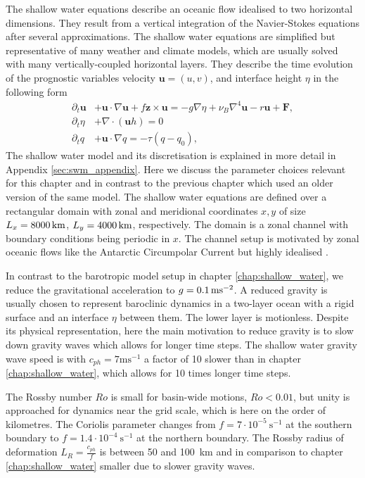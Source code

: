 The shallow water equations describe an oceanic flow idealised to two horizontal dimensions. They result from
a vertical integration of the Navier-Stokes equations \citep{Gill1982,Vallis2006} after several approximations.
The shallow water equations are simplified but representative of many weather and climate models, which are
usually solved with many vertically-coupled horizontal layers. They describe the time
evolution of the prognostic variables velocity $\mathbf{u} = (u,v)$, and interface height $\eta$  in the following form 
\begin{align}
\partial_t\mathbf{u} &+ \mathbf{u} \cdot \nabla \mathbf{u} + f\mathbf{z} \times \mathbf{u} =
-g\nabla \eta + \nu_B \nabla^4 \mathbf{u} - r \mathbf{u} + \mathbf{F}, \nonumber \\
\partial_t\eta &+ \nabla \cdot (\mathbf{u}h) = 0 \nonumber \\ 
\partial_tq &+ \mathbf{u} \cdot \nabla q = -\tau(q-q_0),
\label{eq:swm_a64fx}
\end{align}
The shallow water model and its discretisation is explained in more detail in Appendix \ref{sec:swm_appendix}. Here we
discuss the parameter choices relevant for this chapter and in contrast to the previous chapter which used an older version
of the same model. The shallow water equations are defined over a rectangular domain
with zonal and meridional coordinates $x,y$ of size $L_x = 8000\operatorname{km}$, $L_y  = 4000\operatorname{km}$, respectively. The domain
is a zonal channel with boundary conditions being periodic in $x$. The channel setup is motivated by zonal oceanic flows like
the Antarctic Circumpolar Current but highly idealised \citep{Jansen2015,Jansen2015a}.

In contrast to the barotropic model setup in chapter \ref{chap:shallow_water}, we reduce the gravitational acceleration to
$g = 0.1\operatorname{ms}^{-2}$. A reduced gravity is usually chosen to represent baroclinic dynamics in a two-layer ocean
with a rigid surface and an interface $\eta$ between them. The lower layer is motionless. Despite its physical representation,
here the main motivation to reduce gravity is to slow down gravity waves which allows for longer time steps.
The shallow water gravity wave speed is with $c_{ph} = 7 \mathrm{ms}^{-1}$ a factor of 10 slower than in
chapter \ref{chap:shallow_water}, which allows for 10 times longer time steps.

The Rossby number $Ro$ is small for basin-wide motions, $Ro < 0.01$, but unity is approached for dynamics near the grid scale,
which is here on the order of kilometres. The Coriolis parameter changes from $f=7\cdot10^{-5}~\mathrm{s}^{-1}$ at the southern boundary
to $f=1.4\cdot10^{-4}~\mathrm{s}^{-1}$ at the northern boundary. The Rossby radius of deformation $L_R = \tfrac{c_{ph}}{f}$ is
between 50 and 100~km and in comparison to chapter \ref{chap:shallow_water} smaller due to slower gravity waves.

